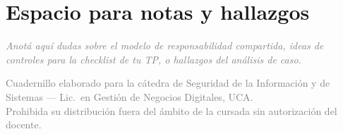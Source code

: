 \documentclass[12pt,a4paper]{article}
\begin{document}
\vspace{1cm}

\section{Espacio para notas y hallazgos}

\begin{tcolorbox}[colback=grisClaro, colframe=gray!50, arc=2mm, height=7cm]
\textcolor{gray}{\itshape Anot\'a aqu\'i dudas sobre el modelo de responsabilidad compartida, ideas de controles para la checklist de tu TP, o hallazgos del an\'alisis de caso.}
\end{tcolorbox}

\vfill
\begin{center}
\small\textcolor{gray}{%
Cuadernillo elaborado para la c\'atedra de Seguridad de la Informaci\'on y de
Sistemas --- Lic.\ en Gesti\'on de Negocios Digitales, UCA.\\
Prohibida su distribuci\'on fuera del \'ambito de la cursada sin autorizaci\'on del docente.}
\end{center}
\end{document}
